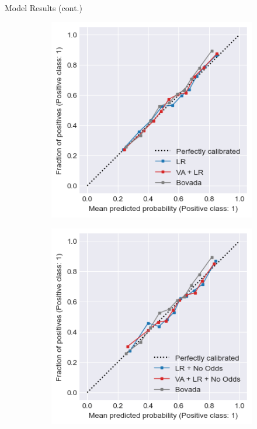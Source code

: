 \documentclass[aspectratio=169,xcolor=dvipsnames]{beamer}
\begin{document}
\begin{frame}{Model Results (cont.)}
    \begin{figure}
        \centering
        \captionsetup{justification=centering}
        \begin{subfigure}{.24\linewidth}
            \centering
            \includegraphics[width=\linewidth]{figures/lr_and_va.png}
        \end{subfigure}
        \begin{subfigure}{.24\linewidth}
            \centering
            \includegraphics[width=\linewidth]{figures/lr_no_odds_and_va.png}

\end{subfigure}
\end{figure}
\end{frame}
\end{document}

